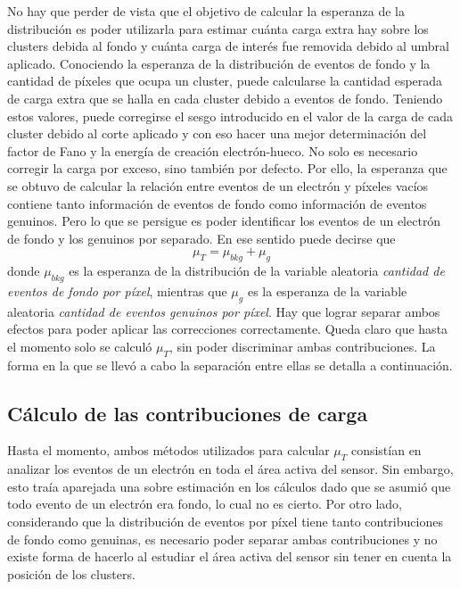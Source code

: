 No hay que perder de vista que el objetivo de calcular la esperanza de la distribución es poder utilizarla para estimar cuánta carga extra hay sobre los clusters debida al fondo y cuánta carga de interés fue removida debido al umbral aplicado. 
%
Conociendo la esperanza de la distribución de eventos de fondo y la cantidad de píxeles que ocupa un cluster, puede calcularse la cantidad esperada de carga extra que se halla en cada cluster debido a eventos de fondo. Teniendo estos valores, puede corregirse el sesgo introducido en el valor de la carga de cada cluster debido al corte aplicado y con eso hacer una mejor determinación del factor de Fano y la energía de creación electrón-hueco. No solo es necesario corregir la carga por exceso, sino también por defecto. Por ello, la esperanza que se obtuvo de calcular la relación entre eventos de un electrón y píxeles vacíos contiene tanto información de eventos de fondo como información de eventos genuinos. Pero lo que se persigue es poder identificar los eventos de un electrón de fondo y los genuinos por separado. En ese sentido puede decirse que 
\begin{equation*}
    \mu_{T} = \mu_{bkg} + \mu_{g}
\end{equation*}
donde $\mu_{bkg}$ es la esperanza de la distribución de la variable aleatoria \textit{cantidad de eventos de fondo por píxel}, mientras que $\mu_{g}$ es la esperanza de la variable aleatoria \textit{cantidad de eventos genuinos por píxel}. Hay que lograr separar ambos efectos para poder aplicar las correcciones correctamente. 
Queda claro que hasta el momento solo se calculó $\mu_{T}$, sin poder discriminar ambas contribuciones. La forma en la que se llevó a cabo la separación entre ellas se detalla a continuación.

\subsection{Cálculo de las contribuciones de carga}
\noindent Hasta el momento, ambos métodos utilizados para calcular $\mu_{T}$ consistían en analizar los eventos de un electrón en toda el área activa del sensor. Sin embargo, esto traía aparejada una sobre estimación en los cálculos dado que se asumió que todo evento de un electrón era fondo, lo cual no es cierto. Por otro lado, considerando que la distribución de eventos por píxel tiene tanto contribuciones de fondo como genuinas, es necesario poder separar ambas contribuciones y no existe forma de hacerlo al estudiar el área activa del sensor sin tener en cuenta la posición de los clusters.

